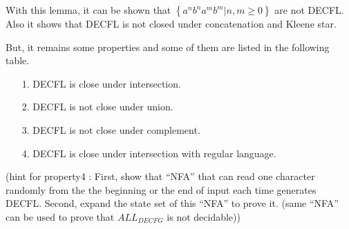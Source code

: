 \documentclass{article}
\begin{document}
\begin{itemize}
            With this lemma, it can be shown that $\left\{ a^{n}b^{n}a^{m}b^{m} | n,m \geq 0 \right\}$ are not DECFL. Also it shows that DECFL is not closed under concatenation and Kleene star.
            
            But, it remains some properties and some of them are listed in the following table.
            \begin{itemize}
						\item[1. ] DECFL is close under intersection.
						\item[2. ] DECFL is not close under union.
						\item[3. ] DECFL is not close under complement.
						\item[4. ] DECFL is close under intersection with regular language.
					\end{itemize}
            (hint for property4 : First, show that ``NFA'' that can read one character randomly from the the beginning or the end of input each time generates DECFL. Second, expand the state set of this ``NFA'' to prove it. (same ``NFA'' can be used to prove that $ALL_{DECFG}$ is not decidable))
            
            
    \end{itemize}

    
\end{document}
